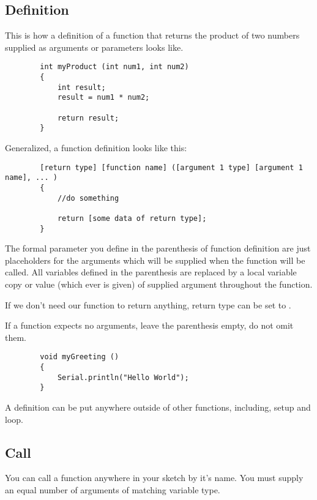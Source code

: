 \documentclass{article}
\begin{document}
	\subsection{Definition}

		This is how a definition of a function that returns the product of two numbers supplied as arguments or parameters looks like.

		\begin{lstlisting}
		int myProduct (int num1, int num2)
		{
			int result;
			result = num1 * num2;

			return result;
		}
		\end{lstlisting}

		Generalized, a function definition looks like this:

		\begin{lstlisting}
		[return type] [function name] ([argument 1 type] [argument 1 name], ... )
		{
			//do something
			
			return [some data of return type];
		}
		\end{lstlisting}

		The formal parameter you define in the parenthesis of function definition are just placeholders for the arguments which will be supplied when the function will be called. All variables defined in the parenthesis are replaced by a local variable copy or value (which ever is given) of supplied argument throughout the function.

		If we don't need our function to return anything, return type can be set to .

		If a function expects no arguments, leave the parenthesis empty, do not omit them.
		
		\begin{lstlisting}
		void myGreeting ()
		{
			Serial.println("Hello World");
		}
		\end{lstlisting}

		A definition can be put anywhere outside of other functions, including, setup and loop.

	\subsection{Call}

		You can call a function anywhere in your sketch by it's name. You must supply an equal number of arguments of matching variable type.
\end{document}

